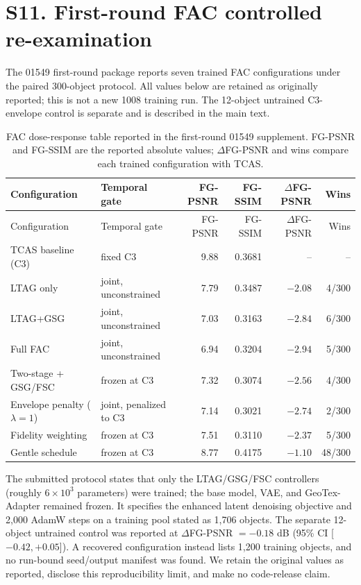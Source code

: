 \documentclass[11pt]{article}
\begin{document}
\section*{S11. First-round FAC controlled re-examination}
The 01549 first-round package reports seven trained FAC configurations under the paired 300-object protocol. All values below are retained as originally reported; this is not a new 1008 training run. The 12-object untrained C3-envelope control is separate and is described in the main text.

\begin{longtable}{p{3.3cm}p{3.5cm}rrrr}
\caption{FAC dose-response table reported in the first-round 01549 supplement. FG-PSNR and FG-SSIM are the reported absolute values; $\Delta$FG-PSNR and wins compare each trained configuration with TCAS.}\label{tab:fac-dose-response}\\
\toprule
Configuration & Temporal gate & FG-PSNR & FG-SSIM & $\Delta$FG-PSNR & Wins \\
\midrule\endfirsthead
\toprule
Configuration & Temporal gate & FG-PSNR & FG-SSIM & $\Delta$FG-PSNR & Wins \\
\midrule\endhead
TCAS baseline (C3) & fixed C3 & 9.88 & 0.3681 & -- & -- \\
LTAG only & joint, unconstrained & 7.79 & 0.3487 & $-2.08$ & 4/300 \\
LTAG+GSG & joint, unconstrained & 7.03 & 0.3163 & $-2.84$ & 6/300 \\
Full FAC & joint, unconstrained & 6.94 & 0.3204 & $-2.94$ & 5/300 \\
Two-stage + GSG/FSC & frozen at C3 & 7.32 & 0.3074 & $-2.56$ & 4/300 \\
Envelope penalty ($\lambda=1$) & joint, penalized to C3 & 7.14 & 0.3021 & $-2.74$ & 2/300 \\
Fidelity weighting & frozen at C3 & 7.51 & 0.3110 & $-2.37$ & 5/300 \\
Gentle schedule & frozen at C3 & 8.77 & 0.4175 & $-1.10$ & 48/300 \\
\bottomrule
\end{longtable}

The submitted protocol states that only the LTAG/GSG/FSC controllers (roughly $6\times10^3$ parameters) were trained; the base model, VAE, and GeoTex-Adapter remained frozen. It specifies the enhanced latent denoising objective and 2,000 AdamW steps on a training pool stated as 1,706 objects. The separate 12-object untrained control was reported at $\Delta$FG-PSNR $=-0.18$ dB (95\% CI [$-0.42,+0.05$]). A recovered configuration instead lists 1,200 training objects, and no run-bound seed/output manifest was found. We retain the original values as reported, disclose this reproducibility limit, and make no code-release claim.
\end{document}
